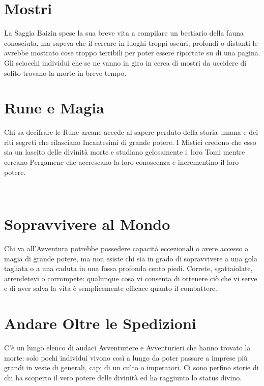 \documentclass[itdr]{subfiles}
\begin{document}
\vspace{3ex}
\section*{Mostri}

La Saggia Baizin spese la sua breve vita a compilare un bestiario della fauna conosciuta, ma sapeva che il cercare in luoghi troppi oscuri, profondi o distanti le avrebbe mostrato cose troppo terribili per poter essere riportate su di una pagina. Gli sciocchi individui che se ne vanno in giro in cerca di mostri da uccidere di solito trovano la morte in breve tempo.

\vspace{3ex}
\section*{Rune e Magia}

Chi sa decifrare le Rune arcane accede al sapere perduto della storia umana e dei riti segreti che rilasciano Incantesimi di grande potere. I Mistici credono che esso sia un lascito delle divinità morte e studiano gelosamente i~loro Tomi mentre cercano Pergamene che accrescano la loro conoscenza e incrementino il loro potere.

\vfill
\break

~\vspace{-17.5pt}
\section*{Sopravvivere al Mondo}

Chi va all’Avventura potrebbe possedere capacità eccezionali o avere accesso a magia di grande potere, ma non esiste chi sia in grado di sopravvivere a una gola tagliata o a una caduta in una fossa profonda cento piedi. Correte, sgattaiolate, arrendetevi o corrompete: qualunque cosa vi consenta di ottenere ciò che vi serve e di aver salva la vita è semplicemente efficace quanto il combattere.

\vfill
\section*{Andare Oltre le Spedizioni}

C’è un lungo elenco di audaci Avventuriere e Avventurieri che hanno trovato la morte: solo pochi individui vivono così a lungo da poter passare a imprese più grandi in veste di generali, capi di un culto o imperatori. Ci sono perfino storie di chi ha scoperto il vero potere delle divinità ed ha raggiunto lo status divino.
\end{document}
